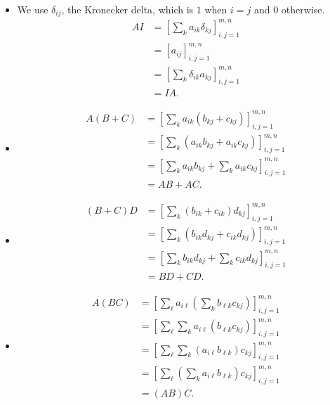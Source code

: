\begin{solution}
\begin{itemize}
	\item We use \(\delta_{ij}\), the Kronecker delta, which is \(1\) when \(i = j\) and \(0\) otherwise.
	\begin{align*}
	AI &= \left[\sum_k a_{ik} \delta_{kj}\right]_{i, j = 1}^{m, n}\\
	&= [a_{ij}]_{i, j = 1}^{m, n}\\
	&= \left[\sum_k \delta_{ik} a_{kj}\right]_{i, j = 1}^{m, n}\\
	&= IA.
	\end{align*}
	\item \begin{align*}
	A (B + C) &= \left[\sum_k a_{ik} (b_{kj} + c_{kj})\right]_{i, j = 1}^{m, n}\\
	&= \left[\sum_k \left(a_{ik} b_{kj} + a_{ik} c_{kj}\right)\right]_{i, j = 1}^{m, n}\\
	&= \left[\sum_k a_{ik} b_{kj} + \sum_k a_{ik} c_{kj}\right]_{i, j = 1}^{m, n}\\
	&= AB + AC.
	\end{align*}
	\item  \begin{align*}
	(B + C) D &= \left[\sum_k (b_{ik} + c_{ik}) d_{kj}\right]_{i, j = 1}^{m, n}\\
	&= \left[\sum_k \left(b_{ik} d_{kj} + c_{ik} d_{kj}\right)\right]_{i, j = 1}^{m, n}\\
	&= \left[\sum_k b_{ik} d_{kj} + \sum_k c_{ik} d_{kj}\right]_{i, j = 1}^{m, n}\\
	&= BD + CD.
	\end{align*}
	\item \begin{align*}
	A(BC) &= \left[\sum_\ell a_{i\ell} \left(\sum_k b_{\ell k} c_{k j}\right)\right]_{i, j = 1}^{m, n}\\
	&= \left[\sum_\ell \sum_k a_{i\ell} (b_{\ell k} c_{kj})\right]_{i, j = 1}^{m, n}\\
	&= \left[\sum_\ell \sum_k (a_{i\ell} b_{\ell k}) c_{kj}\right]_{i, j = 1}^{m, n}\\
	&= \left[\sum_\ell \left(\sum_k a_{i\ell} b_{\ell k}\right) c_{kj}\right]_{i, j = 1}^{m, n}\\
	&= (AB)C.
	\end{align*}
\end{itemize}
\end{solution}

